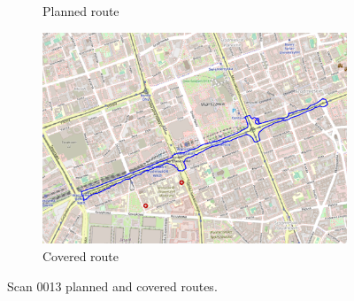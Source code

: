 \documentclass[a4paper,12pt]{book}
\begin{document}
\begin{enumerate}
\begin{figure}[H]
\begin{subfigure}{.90\textwidth}
			\caption{Planned route}
			\label{fig:a13}
		\end{subfigure}%
		\linebreak
		\begin{subfigure}{.90\textwidth}
			\centering
			\includegraphics[width=1\linewidth]{route_c13}
			\caption{Covered route}
			\label{fig:b13}
		\end{subfigure}
		\caption{Scan 0013 planned and covered routes.}
		\label{fig:fig13}
	\end{figure}
	\pagebreak
	

\end{enumerate}
\end{document}
